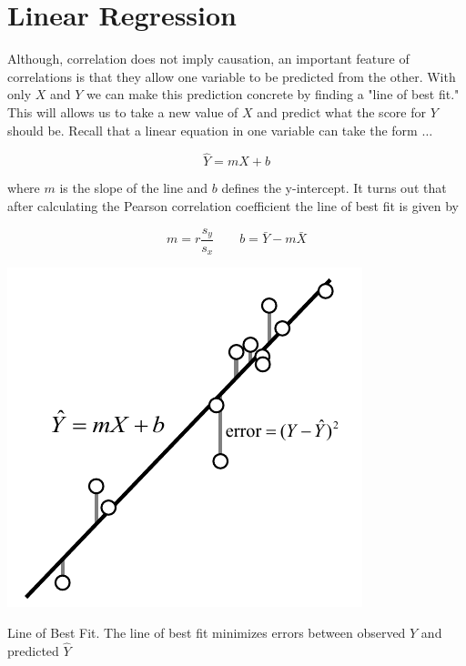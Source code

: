 \documentclass{tufte-handout}
\begin{document}
\section{Linear Regression}

Although, correlation does not imply causation, an important feature of correlations is that they allow one variable to be predicted from the other. With only $X$ and $Y$ we can make this prediction concrete by finding a "line of best fit." This will allows us to take a new value of $X$ and predict what the score for $Y$ should be. Recall that a linear equation in one variable can take the form $\dots$

\begin{equation*}
\hat{Y}=mX+b
\end{equation*}

where $m$ is the slope of the line and $b$ defines the y-intercept. It turns out that after calculating the Pearson correlation coefficient the line of best fit is given by

\begin{equation*}
m=r\frac{s_y}{s_x} \qquad b=\bar{Y}-m\bar{X}
\end{equation*}


\begin{marginfigure}[10pt]
  \includegraphics[width=\linewidth]{handout8_bestfit}%
  \label{fig:fullfig}%
\caption{Line of Best Fit. The line of best fit minimizes errors between observed $Y$ and predicted $\hat{Y}$}
\end{marginfigure}
\end{document}
